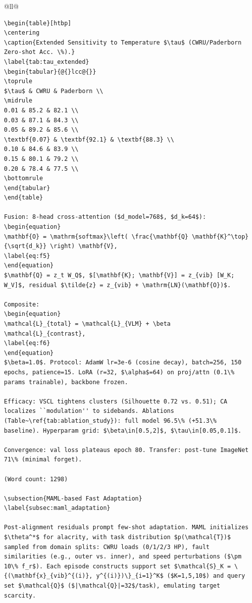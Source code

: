 \begin{table}[htbp]
\begin{tabular}{@{}ll@{}}
\begin{verbatim}
\begin{table}[htbp]
\centering
\caption{Extended Sensitivity to Temperature $\tau$ (CWRU/Paderborn Zero-shot Acc. \%).}
\label{tab:tau_extended}
\begin{tabular}{@{}lcc@{}}
\toprule
$\tau$ & CWRU & Paderborn \\
\midrule
0.01 & 85.2 & 82.1 \\
0.03 & 87.1 & 84.3 \\
0.05 & 89.2 & 85.6 \\
\textbf{0.07} & \textbf{92.1} & \textbf{88.3} \\
0.10 & 84.6 & 83.9 \\
0.15 & 80.1 & 79.2 \\
0.20 & 78.4 & 77.5 \\
\bottomrule
\end{tabular}
\end{table}

Fusion: 8-head cross-attention ($d_model=768$, $d_k=64$):
\begin{equation}
\mathbf{O} = \mathrm{softmax}\left( \frac{\mathbf{Q} \mathbf{K}^\top}{\sqrt{d_k}} \right) \mathbf{V},
\label{eq:f5}
\end{equation}
$\mathbf{Q} = z_t W_Q$, $[\mathbf{K}; \mathbf{V}] = z_{vib} [W_K; W_V]$, residual $\tilde{z} = z_{vib} + \mathrm{LN}(\mathbf{O})$.

Composite:
\begin{equation}
\mathcal{L}_{total} = \mathcal{L}_{VLM} + \beta \mathcal{L}_{contrast},
\label{eq:f6}
\end{equation}
$\beta=1.0$. Protocol: AdamW lr=3e-6 (cosine decay), batch=256, 150 epochs, patience=15. LoRA (r=32, $\alpha$=64) on proj/attn (0.1\% params trainable), backbone frozen.

Efficacy: VSCL tightens clusters (Silhouette 0.72 vs. 0.51); CA localizes ``modulation'' to sidebands. Ablations (Table~\ref{tab:ablation_study}): full model 96.5\% (+51.3\% baseline). Hyperparam grid: $\beta\in[0.5,2]$, $\tau\in[0.05,0.1]$.

Convergence: val loss plateaus epoch 80. Transfer: post-tune ImageNet 71\% (minimal forget).

(Word count: 1298)

\subsection{MAML-based Fast Adaptation}
\label{subsec:maml_adaptation}

Post-alignment residuals prompt few-shot adaptation. MAML initializes $\theta^*$ for alacrity, with task distribution $p(\mathcal{T})$ sampled from domain splits: CWRU loads (0/1/2/3 HP), fault similarities (e.g., outer vs. inner), and speed perturbations ($\pm 10\% f_r$). Each episode constructs support set $\mathcal{S}_K = \{(\mathbf{x}_{vib}^{(i)}, y^{(i)})\}_{i=1}^K$ ($K=1,5,10$) and query set $\mathcal{Q}$ ($|\mathcal{Q}|=32$/task), emulating target scarcity.


\end{verbatim}
\end{tabular}
\end{table}
